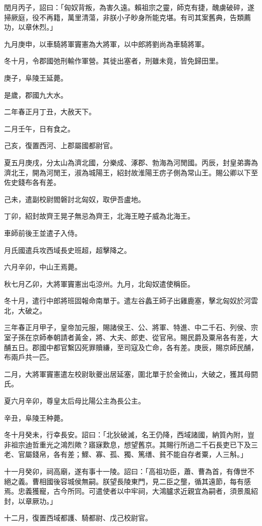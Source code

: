 \begin{pinyinscope}
閏月丙子，詔曰：「匈奴背叛，為害久遠。賴祖宗之靈，師克有捷，醜虜破碎，遂掃厥庭，役不再籍，萬里清蕩，非朕小子眇身所能克堪。有司其案舊典，告類薦功，以章休烈。」

九月庚申，以車騎將軍竇憲為大將軍，以中郎將劉尚為車騎將軍。

冬十月，令郡國弛刑輸作軍營。其徙出塞者，刑雖未竟，皆免歸田里。

庚子，阜陵王延薨。

是歲，郡國九大水。

二年春正月丁丑，大赦天下。

二月壬午，日有食之。

己亥，復置西河、上郡屬國都尉官。

夏五月庚戌，分太山為濟北國，分樂成、涿郡、勃海為河閒國。丙辰，封皇弟壽為濟北王，開為河閒王，淑為城陽王，紹封故淮陽王疠子側為常山王。賜公卿以下至佐史錢布各有差。

己未，遣副校尉閻磐討北匈奴，取伊吾盧地。

丁卯，紹封故齊王晃子無忌為齊王，北海王睦子威為北海王。

車師前後王並遣子入侍。

月氏國遣兵攻西域長史班超，超擊降之。

六月辛卯，中山王焉薨。

秋七月乙卯，大將軍竇憲出屯涼州。九月，北匈奴遣使稱臣。

冬十月，遣行中郎將班固報命南單于。遣左谷蠡王師子出雞鹿塞，擊北匈奴於河雲北，大破之。

三年春正月甲子，皇帝加元服，賜諸侯王、公、將軍、特進、中二千石、列侯、宗室子孫在京師奉朝請者黃金，將、大夫、郎吏、從官帛。賜民爵及粟帛各有差，大酺五日。郡國中都官繫囚死罪贖縑，至司寇及亡命，各有差。庚辰，賜京師民酺，布兩戶共一匹。

二月，大將軍竇憲遣左校尉耿夔出居延塞，圍北單于於金微山，大破之，獲其母閼氏。

夏六月辛卯，尊皇太后母比陽公主為長公主。

辛丑，阜陵王种薨。

冬十月癸未，行幸長安。詔曰：「北狄破滅，名王仍降，西域諸國，納質內附，豈非祖宗迪哲重光之鴻烈歟？寤寐歎息，想望舊京。其賜行所過二千石長吏已下及三老、官屬錢帛，各有差；鰥、寡、孤、獨、篤缮、貧不能自存者粟，人三斛。」

十一月癸卯，祠高廟，遂有事十一陵。詔曰：「高祖功臣，蕭、曹為首，有傳世不絕之義。曹相國後容城侯無嗣。朕望長陵東門，見二臣之壟，循其遠節，每有感焉。忠義獲寵，古今所同。可遣使者以中牢祠，大鴻臚求近親宜為嗣者，須景風紹封，以章厥功。」

十二月，復置西域都護、騎都尉、戊己校尉官。


\end{pinyinscope}
